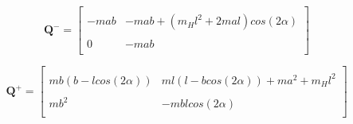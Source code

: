 \documentclass{./springer/svjour3}
\newcommand{\mb}[1]{\mathbf{#1}}
\begin{document}
\begin{equation}
\mb{Q^-} = 
\label{eq:Q-}
\begin{bmatrix}
\\-mab & -mab + (m_Hl^2+2mal)cos(2\alpha)\\
\\0 & -mab\\
\end{bmatrix}
\end{equation}

\begin{equation}
\mb{Q^+} = 
\label{eq:Q+}
\begin{bmatrix}
\\mb(b-lcos(2\alpha)) & ml(l-bcos(2\alpha)) + ma^2 + m_Hl^2\\
\\mb^2 & -mblcos(2\alpha)\\
\end{bmatrix}
\end{equation}



\end{document}
